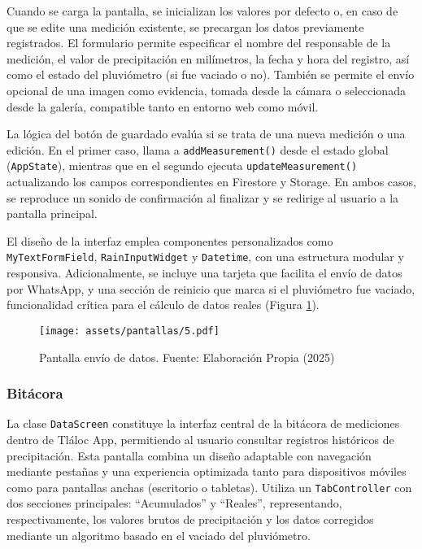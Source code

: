Cuando se carga la pantalla, se inicializan los valores por defecto o, en caso de que se edite una medición existente, se precargan los datos previamente registrados. El formulario permite especificar el nombre del responsable de la medición, el valor de precipitación en milímetros, la fecha y hora del registro, así como el estado del pluviómetro (si fue vaciado o no). También se permite el envío opcional de una imagen como evidencia, tomada desde la cámara o seleccionada desde la galería, compatible tanto en entorno web como móvil.

La lógica del botón de guardado evalúa si se trata de una nueva medición o una edición. En el primer caso, llama a \texttt{addMeasurement()} desde el estado global (\texttt{AppState}), mientras que en el segundo ejecuta \texttt{updateMeasurement()} actualizando los campos correspondientes en Firestore y Storage. En ambos casos, se reproduce un sonido de confirmación al finalizar y se redirige al usuario a la pantalla principal.

El diseño de la interfaz emplea componentes personalizados como \texttt{MyTextFormField}, \texttt{RainInputWidget} y \texttt{Datetime}, con una estructura modular y responsiva. Adicionalmente, se incluye una tarjeta que facilita el envío de datos por WhatsApp, y una sección de reinicio que marca si el pluviómetro fue vaciado, funcionalidad crítica para el cálculo de datos reales (Figura \ref{pantallas5}).

\begin{figure}[h!]
\centering
  \texttt{[image: assets/pantallas/5.pdf]}
  \caption{Pantalla envío de datos. Fuente: Elaboración Propia (2025)}
  \label{pantallas5}
\end{figure}



\newpage
\subsubsection*{Bitácora}

La clase \texttt{DataScreen} %
constituye la interfaz central de la bitácora de mediciones dentro de Tláloc App, permitiendo al usuario consultar registros históricos de precipitación. Esta pantalla combina un diseño adaptable con navegación mediante pestañas y una experiencia optimizada tanto para dispositivos móviles como para pantallas anchas (escritorio o tabletas). Utiliza un \texttt{TabController} con dos secciones principales: ``Acumulados'' y ``Reales'', representando, respectivamente, los valores brutos de precipitación y los datos corregidos mediante un algoritmo basado en el vaciado del pluviómetro.

